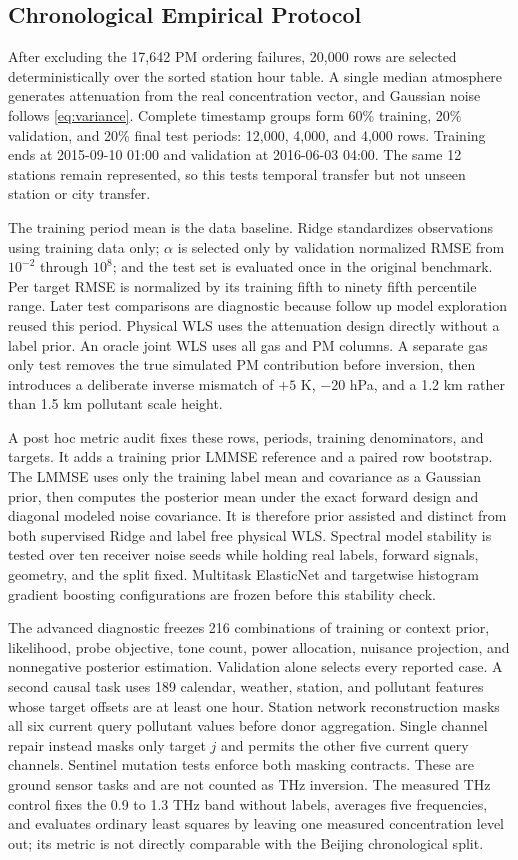 \documentclass[conference]{IEEEtran}
\begin{document}
\subsection{Chronological Empirical Protocol}

After excluding the 17,642 PM ordering failures, 20,000 rows are selected deterministically over the sorted station hour table. A single median atmosphere generates attenuation from the real concentration vector, and Gaussian noise follows \eqref{eq:variance}. Complete timestamp groups form 60\% training, 20\% validation, and 20\% final test periods: 12,000, 4,000, and 4,000 rows. Training ends at 2015-09-10 01:00 and validation at 2016-06-03 04:00. The same 12 stations remain represented, so this tests temporal transfer but not unseen station or city transfer.

The training period mean is the data baseline. Ridge standardizes observations using training data only; $\alpha$ is selected only by validation normalized RMSE from $10^{-2}$ through $10^8$; and the test set is evaluated once in the original benchmark. Per target RMSE is normalized by its training fifth to ninety fifth percentile range. Later test comparisons are diagnostic because follow up model exploration reused this period. Physical WLS uses the attenuation design directly without a label prior. An oracle joint WLS uses all gas and PM columns. A separate gas only test removes the true simulated PM contribution before inversion, then introduces a deliberate inverse mismatch of $+5$ K, $-20$ hPa, and a 1.2 km rather than 1.5 km pollutant scale height.

A post hoc metric audit fixes these rows, periods, training denominators, and targets. It adds a training prior LMMSE reference and a paired row bootstrap. The LMMSE uses only the training label mean and covariance as a Gaussian prior, then computes the posterior mean under the exact forward design and diagonal modeled noise covariance. It is therefore prior assisted and distinct from both supervised Ridge and label free physical WLS. Spectral model stability is tested over ten receiver noise seeds while holding real labels, forward signals, geometry, and the split fixed. Multitask ElasticNet and targetwise histogram gradient boosting configurations are frozen before this stability check.

The advanced diagnostic freezes 216 combinations of training or context prior, likelihood, probe objective, tone count, power allocation, nuisance projection, and nonnegative posterior estimation. Validation alone selects every reported case. A second causal task uses 189 calendar, weather, station, and pollutant features whose target offsets are at least one hour. Station network reconstruction masks all six current query pollutant values before donor aggregation. Single channel repair instead masks only target $j$ and permits the other five current query channels. Sentinel mutation tests enforce both masking contracts. These are ground sensor tasks and are not counted as THz inversion. The measured THz control fixes the 0.9 to 1.3 THz band without labels, averages five frequencies, and evaluates ordinary least squares by leaving one measured concentration level out; its metric is not directly comparable with the Beijing chronological split.
\end{document}
